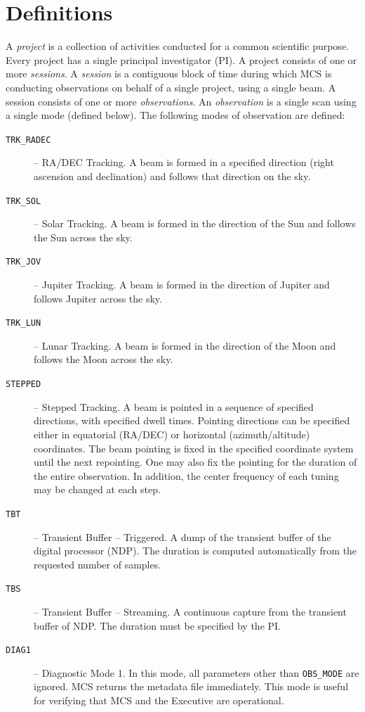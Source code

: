 
\section{Definitions}
\label{sec:definitions}

A \textit{project} is a collection of activities conducted for a common scientific purpose.  Every project has a single principal investigator (PI).  A project consists of one or more \textit{sessions}.  A \textit{session} is a contiguous block of time during which MCS is conducting observations on behalf of a single project, using a single beam.  A session consists of one or more \textit{observations}.  An \textit{observation} is a single scan using a single mode (defined below).  The following modes of observation are defined:

\begin{description}
\item[\texttt{TRK\_RADEC}] -- RA/DEC Tracking.  A beam is formed in a specified direction (right ascension and declination) and follows that direction on the sky.

\item[\texttt{TRK\_SOL}] -- Solar Tracking.  A beam is formed in the direction of the Sun and follows the Sun across the sky.

\item[\texttt{TRK\_JOV}] -- Jupiter Tracking.  A beam is formed in the direction of Jupiter and follows Jupiter across the sky.

\item[\texttt{TRK\_LUN}] -- Lunar Tracking.  A beam is formed in the direction of the Moon and follows the Moon across the sky.

\item[\texttt{STEPPED}] -- Stepped Tracking.  A beam is pointed in a sequence of specified directions, with specified dwell times.  Pointing directions can be specified either in equatorial (RA/DEC) or horizontal (azimuth/altitude) coordinates.  The beam pointing is fixed in the specified coordinate system until the next repointing.  One may also fix the pointing for the duration of the entire observation.  In addition, the center frequency of each tuning may be changed at each step.

\item[\texttt{TBT}] -- Transient Buffer -- Triggered.  A dump of the transient buffer of the digital processor (NDP).  The duration is computed automatically from the requested number of samples.

\item[\texttt{TBS}] -- Transient Buffer -- Streaming.  A continuous capture from the transient buffer of NDP.  The duration must be specified by the PI.

\item[\texttt{DIAG1}] -- Diagnostic Mode 1.  In this mode, all parameters other than \texttt{OBS\_MODE} are ignored.  MCS returns the metadata file immediately.  This mode is useful for verifying that MCS and the Executive are operational.
\end{description}

